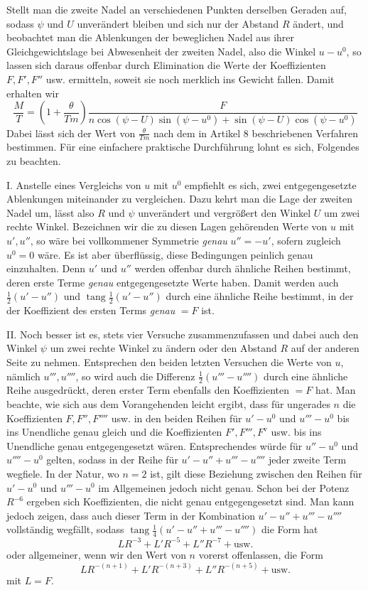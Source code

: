 Stellt man die zweite Nadel an verschiedenen Punkten derselben Geraden auf, sodass $\psi$ und $U$ unverändert bleiben und sich nur der Abstand $R$ ändert, und beobachtet man die Ablenkungen der beweglichen Nadel aus ihrer Gleichgewichtslage bei Abwesenheit der zweiten Nadel, also die Winkel $u-u^0$, so lassen sich daraus offenbar durch Elimination die Werte der Koeffizienten $F,F',F''$ usw. ermitteln, soweit sie noch merklich ins Gewicht fallen. Damit erhalten wir
\[
\frac MT=\left(1+\frac{\theta}{Tm}\right)\frac{F}{n\cos(\psi-U)\sin(\psi-u^0)+\sin(\psi-U)\cos(\psi-u^0)}
\]
Dabei lässt sich der Wert von $\frac{\theta}{Tm}$ nach dem in Artikel $8$ beschriebenen Verfahren bestimmen. Für eine einfachere praktische Durchführung lohnt es sich, Folgendes zu beachten.

I. Anstelle eines Vergleichs von $u$ mit $u^0$ empfiehlt es sich, zwei entgegengesetzte Ablenkungen miteinander zu vergleichen. Dazu kehrt man die Lage der zweiten Nadel um, lässt also $R$ und $\psi$ unverändert und vergrößert den Winkel $U$ um zwei rechte Winkel. Bezeichnen wir die zu diesen Lagen gehörenden Werte von $u$ mit $u',u''$, so wäre bei vollkommener Symmetrie \textit{genau} $u''=-u'$, sofern zugleich $u^0=0$ wäre. Es ist aber überflüssig, diese Bedingungen peinlich genau einzuhalten. Denn $u'$ und $u''$ werden offenbar durch ähnliche Reihen bestimmt, deren erste Terme \textit{genau} entgegengesetzte Werte haben. Damit werden auch $\tfrac12(u'-u'')$ und $\operatorname{tang}\tfrac12(u'-u'')$ durch eine ähnliche Reihe bestimmt, in der der Koeffizient des ersten Terms \textit{genau} $=F$ ist.

II. Noch besser ist es, stets vier Versuche zusammenzufassen und dabei auch den Winkel $\psi$ um zwei rechte Winkel zu ändern oder den Abstand $R$ auf der anderen Seite zu nehmen. Entsprechen den beiden letzten Versuchen die Werte von $u$, nämlich $u''',u''''$, so wird auch die Differenz $\tfrac12(u'''-u'''')$ durch eine ähnliche Reihe ausgedrückt, deren erster Term ebenfalls den Koeffizienten $=F$ hat. Man beachte, wie sich aus dem Vorangehenden leicht ergibt, dass für ungerades $n$ die Koeffizienten $F,F'',F''''$ usw. in den beiden Reihen für $u'-u^0$ und $u'''-u^0$ bis ins Unendliche genau gleich und die Koeffizienten $F',F''',F^{\mathrm{v}}$ usw. bis ins Unendliche genau entgegengesetzt wären. Entsprechendes würde für $u''-u^0$ und $u''''-u^0$ gelten, sodass in der Reihe für $u'-u''+u'''-u''''$ jeder zweite Term wegfiele. In der Natur, wo $n=2$ ist, gilt diese Beziehung zwischen den Reihen für $u'-u^0$ und $u'''-u^0$ im Allgemeinen jedoch nicht genau. Schon bei der Potenz $R^{-6}$ ergeben sich Koeffizienten, die nicht genau entgegengesetzt sind. Man kann jedoch zeigen, dass auch dieser Term in der Kombination $u'-u''+u'''-u''''$ vollständig wegfällt, sodass $\operatorname{tang}\tfrac14(u'-u''+u'''-u'''')$ die Form hat
\[
LR^{-3}+L'R^{-5}+L''R^{-7}+\text{usw.}
\]
oder allgemeiner, wenn wir den Wert von $n$ vorerst offenlassen, die Form
\[
LR^{-(n+1)}+L'R^{-(n+3)}+L''R^{-(n+5)}+\text{usw.}
\]
mit $L=F$.

